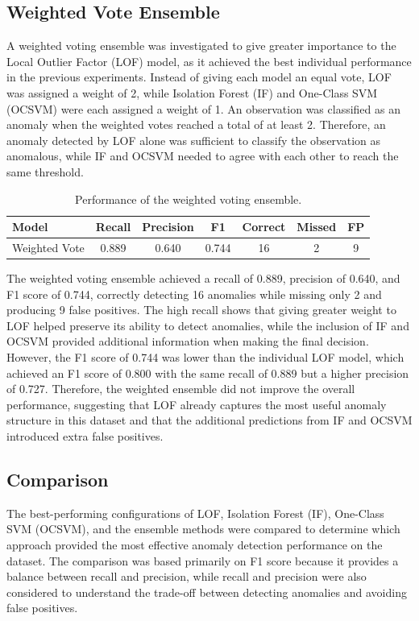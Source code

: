 \documentclass[a4paper,12pt]{article}
\begin{document}
\subsection{Weighted Vote Ensemble}

A weighted voting ensemble was investigated to give greater importance to the Local Outlier Factor (LOF) model, as it achieved the best individual performance in the previous experiments. Instead of giving each model an equal vote, LOF was assigned a weight of 2, while Isolation Forest (IF) and One-Class SVM (OCSVM) were each assigned a weight of 1. An observation was classified as an anomaly when the weighted votes reached a total of at least 2. Therefore, an anomaly detected by LOF alone was sufficient to classify the observation as anomalous, while IF and OCSVM needed to agree with each other to reach the same threshold.

\begin{table}
	\centering
	\small
	\setlength{\tabcolsep}{5pt}
	\caption{Performance of the weighted voting ensemble.}
	\label{tab:weighted_vote}
	\begin{tabular}{lcccccc}
		\hline
		Model & Recall & Precision & F1 & Correct & Missed & FP \\
		\hline
		Weighted Vote & 0.889 & 0.640 & 0.744 & 16 & 2 & 9 \\
		\hline
	\end{tabular}
\end{table}

The weighted voting ensemble achieved a recall of 0.889, precision of 0.640, and F1 score of 0.744, correctly detecting 16 anomalies while missing only 2 and producing 9 false positives. The high recall shows that giving greater weight to LOF helped preserve its ability to detect anomalies, while the inclusion of IF and OCSVM provided additional information when making the final decision. However, the F1 score of 0.744 was lower than the individual LOF model, which achieved an F1 score of 0.800 with the same recall of 0.889 but a higher precision of 0.727. Therefore, the weighted ensemble did not improve the overall performance, suggesting that LOF already captures the most useful anomaly structure in this dataset and that the additional predictions from IF and OCSVM introduced extra false positives.
\subsection{Comparison}

The best-performing configurations of LOF, Isolation Forest (IF), One-Class SVM (OCSVM), and the ensemble methods were compared to determine which approach provided the most effective anomaly detection performance on the dataset. The comparison was based primarily on F1 score because it provides a balance between recall and precision, while recall and precision were also considered to understand the trade-off between detecting anomalies and avoiding false positives.
\end{document}
